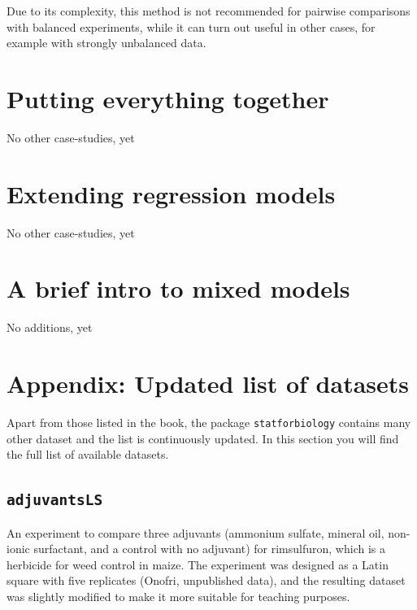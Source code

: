 \documentclass[
  letterpaper,
  DIV=11,
  numbers=noendperiod]{scrreprt}
\begin{document}
Due to its complexity, this method is not recommended for pairwise
comparisons with balanced experiments, while it can turn out useful in
other cases, for example with strongly unbalanced data.


\chapter{Putting everything together}\label{putting-everything-together}

No other case-studies, yet


\chapter{Extending regression models}\label{extending-regression-models}

No other case-studies, yet


\chapter{A brief intro to mixed
models}\label{a-brief-intro-to-mixed-models}

No additions, yet


\chapter{Appendix: Updated list of
datasets}\label{appendix-updated-list-of-datasets}

Apart from those listed in the book, the package \texttt{statforbiology}
contains many other dataset and the list is continuously updated. In
this section you will find the full list of available datasets.

\section*{\texorpdfstring{\texttt{adjuvantsLS}}{adjuvantsLS}}\label{adjuvantsls}


An experiment to compare three adjuvants (ammonium sulfate, mineral oil,
non-ionic surfactant, and a control with no adjuvant) for rimsulfuron,
which is a herbicide for weed control in maize. The experiment was
designed as a Latin square with five replicates (Onofri, unpublished
data), and the resulting dataset was slightly modified to make it more
suitable for teaching purposes.
\end{document}
